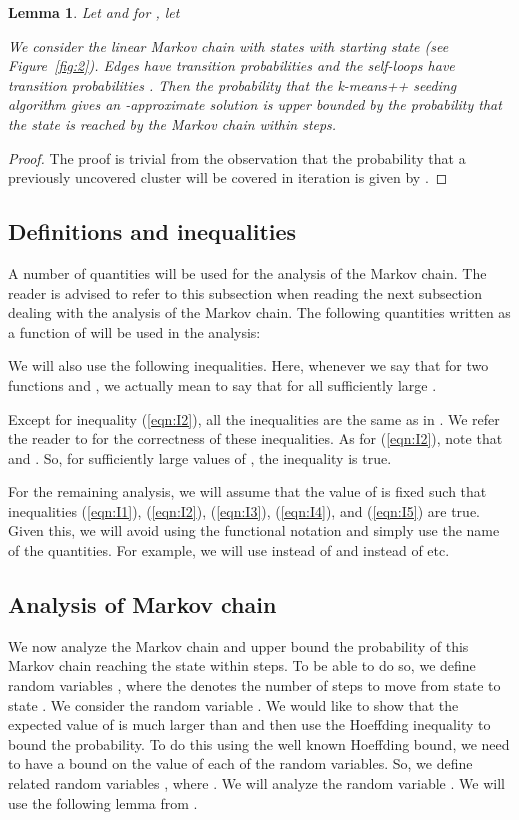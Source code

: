 \documentclass[11pt]{article}
\newtheorem{lemma}[theorem]{Lemma}
\begin{document}
\begin{lemma}
Let  and for , let 

We consider the linear Markov chain with states  with starting state  (see Figure~\ref{fig:2}).
Edges  have transition probabilities  and the self-loops  have transition probabilities .
Then the probability that the k-means++ seeding algorithm gives an -approximate solution is upper bounded by the probability that the state  is reached by the Markov chain within  steps.
\end{lemma}
\begin{proof}
The proof is trivial from the observation that the probability that a previously uncovered cluster will be covered in iteration  is given by .
\end{proof}


\subsection{Definitions and inequalities}
A number of quantities will be used for the analysis of the Markov chain. 
The reader is advised to refer to this subsection when reading the next subsection dealing with the analysis of the Markov chain.
The following quantities written as a function of  will be used in the analysis:


We will also use the following inequalities. Here, whenever we say that  for two functions  and , we actually mean to say that  for all sufficiently large .


Except for inequality (\ref{eqn:I2}), all the inequalities are the same as in \cite{br12}. 
We refer the reader to \cite{br12} for the correctness of these inequalities.
As for (\ref{eqn:I2}), note that  and .
So, for sufficiently large values of , the inequality is true.

For the remaining analysis, we will assume that the value of  is fixed such that inequalities (\ref{eqn:I1}), (\ref{eqn:I2}), (\ref{eqn:I3}), (\ref{eqn:I4}), and (\ref{eqn:I5}) are true. 
Given this, we will avoid using the functional notation and simply use the name of the quantities. For example, we will use  instead of  and  instead of  etc.


\subsection{Analysis of Markov chain}

We now analyze the Markov chain and upper bound the probability of this Markov chain reaching the state  within  steps. 
To be able to do so, we define random variables , where the  denotes the number of steps to move from state  to state .
We consider the random variable .
We would like to show that the expected value of  is much larger than  and then use the Hoeffding inequality to bound the probability. 
To do this using the well known Hoeffding bound, we need to have a bound on the value of each of the random variables. 
So, we define related random variables , where . 
We will analyze the random variable .
We will use the following lemma from \cite{br12}.
\end{document}
